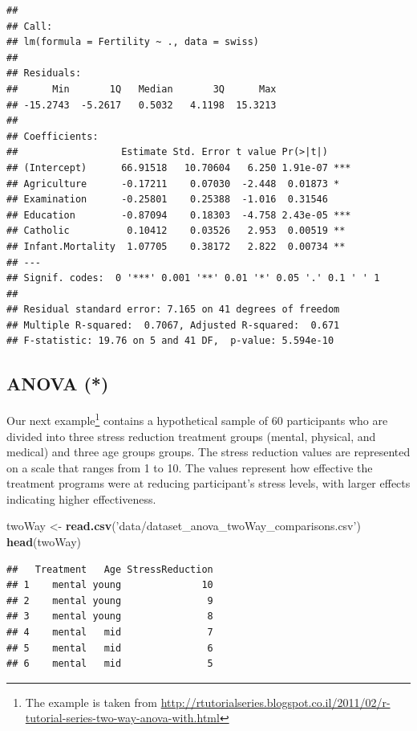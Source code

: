 \documentclass[]{book}
\newenvironment{Shaded}{\begin{snugshade}}{\end{snugshade}}
\newcommand{\KeywordTok}[1]{\textcolor[rgb]{0.13,0.29,0.53}{\textbf{#1}}}
\newcommand{\StringTok}[1]{\textcolor[rgb]{0.31,0.60,0.02}{#1}}
\newcommand{\NormalTok}[1]{#1}
\theoremstyle{definition}
\theoremstyle{definition}
\theoremstyle{definition}
\theoremstyle{remark}
\begin{document}
\begin{verbatim}
## 
## Call:
## lm(formula = Fertility ~ ., data = swiss)
## 
## Residuals:
##      Min       1Q   Median       3Q      Max 
## -15.2743  -5.2617   0.5032   4.1198  15.3213 
## 
## Coefficients:
##                  Estimate Std. Error t value Pr(>|t|)    
## (Intercept)      66.91518   10.70604   6.250 1.91e-07 ***
## Agriculture      -0.17211    0.07030  -2.448  0.01873 *  
## Examination      -0.25801    0.25388  -1.016  0.31546    
## Education        -0.87094    0.18303  -4.758 2.43e-05 ***
## Catholic          0.10412    0.03526   2.953  0.00519 ** 
## Infant.Mortality  1.07705    0.38172   2.822  0.00734 ** 
## ---
## Signif. codes:  0 '***' 0.001 '**' 0.01 '*' 0.05 '.' 0.1 ' ' 1
## 
## Residual standard error: 7.165 on 41 degrees of freedom
## Multiple R-squared:  0.7067, Adjusted R-squared:  0.671 
## F-statistic: 19.76 on 5 and 41 DF,  p-value: 5.594e-10
\end{verbatim}

\subsection{ANOVA (*)}\label{anova}

Our next example\footnote{The example is taken from
  \url{http://rtutorialseries.blogspot.co.il/2011/02/r-tutorial-series-two-way-anova-with.html}}
contains a hypothetical sample of \(60\) participants who are divided
into three stress reduction treatment groups (mental, physical, and
medical) and three age groups groups. The stress reduction values are
represented on a scale that ranges from 1 to 10. The values represent
how effective the treatment programs were at reducing participant's
stress levels, with larger effects indicating higher effectiveness.

\begin{Shaded}
\begin{Highlighting}[]
\NormalTok{twoWay <-}\StringTok{ }\KeywordTok{read.csv}\NormalTok{(}\StringTok{'data/dataset_anova_twoWay_comparisons.csv'}\NormalTok{)}
\KeywordTok{head}\NormalTok{(twoWay)}
\end{Highlighting}
\end{Shaded}

\begin{verbatim}
##   Treatment   Age StressReduction
## 1    mental young              10
## 2    mental young               9
## 3    mental young               8
## 4    mental   mid               7
## 5    mental   mid               6
## 6    mental   mid               5
\end{verbatim}
\end{document}
